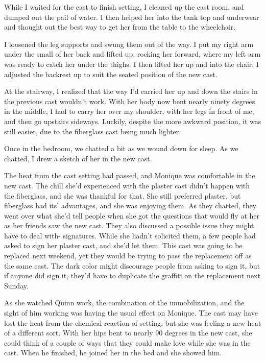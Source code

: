 While I waited for the cast to finish setting, I cleaned up the cast room, and dumped out
the pail of water. I then helped her into the tank top and underwear and thought out the best
way to get her from the table to the wheelchair.

I loosened the leg supports and swung them out of the way. I put my right arm under the
small of her back and lifted up, rocking her forward, where my left arm was ready to catch her
under the thighs. I then lifted her up and into the chair. I adjusted the backrest up to suit
the seated position of the new cast.

At the stairway, I realized that the way I'd carried her up and down the stairs in the
previous cast wouldn't work. With her body now bent nearly ninety degrees in the middle, I had
to carry her over my shoulder, with her legs in front of me, and then go upstairs sideways.
Luckily, despite the more awkward position, it was still easier, due to the fiberglass cast
being much lighter.

Once in the bedroom, we chatted a bit as we wound down for sleep. As we chatted, I drew a
sketch of her in the new cast.

\begin{thought}
The heat from the cast setting had passed, and Monique was comfortable in the new cast. The
chill she'd experienced with the plaster cast didn't happen with the fiberglass, and she was
thankful for that. She still preferred plaster, but fiberglass had its' advantages, and she was
enjoying them. As they chatted, they went over what she'd tell people when she got the questions
that would fly at her as her friends saw the new cast. They also discussed a possible issue they
might have to deal with- signatures. While she hadn't solicited them, a few people had asked to
sign her plaster cast, and she'd let them. This cast was going to be replaced next weekend, yet
they would be trying to pass the replacement off as the same cast. The dark color might
discourage people from asking to sign it, but if anyone did sign it, they'd have to duplicate
the graffiti on the replacement next Sunday.

As she watched Quinn work, the combination of the immobilization, and the sight of him
working was having the usual effect on Monique. The cast may have lost the heat from the
chemical reaction of setting, but she was feeling a new heat of a different sort. With her hips
bent to nearly 90 degrees in the new cast, she could think of a couple of ways that they could
make love while she was in the cast. When he finished, he joined her in the bed and she showed
him.
\end{thought}

